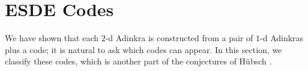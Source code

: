 \documentclass[12pt,twoside,singlespace]{article}
\numberwithin{equation}{section}
\newtheorem{lem}[equation]{Lemma}
\theoremstyle{definition}
\begin{document}
\begin{comment} %

\begin{lem}
\label{lem:minimal-cycles-to-all-cycles}
The set of parities on all cycles of an Adinkra $A$ are determined by parties on minimal (under inclusion) cycles of $A$.
\end{lem}
\begin{proof}
Consider a cycle in a graph as a $\mathbb{F}_2$-vector space over the edges of the graph. It is easy to check that any cycle $C$ is then a sum (as vectors in this vector space) of minimal cycles $C_1, \ldots, C_k$ and the parity of $C$ under a dashing is the sum of the parities of the minimal cycles $C_i$: each dashed edge in the $C_i$'s either appears twice and thus contributes $0$ to the parity (in which case it was not in $C$) or appears once and thus contributes $1$ to the parity (in which case it was in $C$). 
\end{proof}



\begin{proof}
Thanks to Proposition~\ref{prop:product-admissable}, we know that $\mu_1$ is admissable; we now show that $\mu_2$ is admissable as well. What we must prove is the following: given colors $c_1$ and $c_2$, and vertices $v$, $w$, $x$, and $y$, with edges $(v,w)$, $(w,x)$, $(x,y)$, and $(y,v)$ and colors $c(v,w)=c(x,y)=c_1$ and $c(w,x)=c(y,v)=c_2$, we have $\mu_2(v,w)+\mu_2(w,x)+\mu_2(x,y)+\mu_2(y,v)\equiv 1 \pmod{2}$.

Since $\pi$ is a graph homomorphism, and $c_1$, $c_2$, $v$, $w$, $x$, and $y$ are as above, then $\pi(v)$, $\pi(w)$, $\pi(x)$, and $\pi(y)$ satisfy the same condition.  If $\mu_2=\pi^*(\mu)$, then $\mu_2(v,w)+\mu_2(w,x)+\mu_2(x,y)+\mu_2(y,v)=\mu(\pi(v,w))+\mu(\pi(w,x))+\mu(\pi(x,y))+\mu(\pi(y,v))$ and the result follows from the fact that $\mu$ is an admissible dashing.


\end{proof}
\end{comment}


\section{ESDE Codes}

We have shown that each $2$-d Adinkra is constructed from a pair of $1$-d Adinkras plus a code; it is natural to ask which codes can appear. In this section, we classify these codes, which is another part of the conjectures of H\"ubsch \cite{hubsch:weaving}. 
\end{document}
